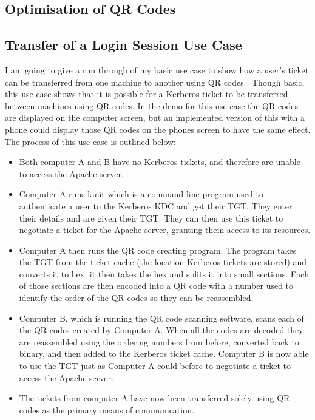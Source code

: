 \documentclass[]{report}   %
\begin{document}
\subsection{Optimisation of QR Codes}


\subsection{Transfer of a Login Session Use Case}
I am going to give a run through of my basic use case to show how a user’s ticket can be transferred from one machine to another using QR codes \cite{YouTubeDemo}. Though basic, this use case shows that it is possible for a Kerberos ticket to be transferred between machines using QR codes. In the demo for this use case the QR codes are displayed on the computer screen, but an implemented version of this with a phone could display those QR codes on the phones screen to have the same effect. The process of this use case is outlined below:

\begin{itemize}
	\item Both computer A and B have no Kerberos tickets, and therefore are unable to access the Apache server.
	\item Computer A runs kinit which is a command line program used to authenticate a user to the Kerberos KDC and get their TGT. They enter their details and are given their TGT. They can then use this ticket to negotiate a ticket for the Apache server, granting them access to its resources.
	\item Computer A then runs the QR code creating program. The program takes the TGT from the ticket cache (the location Kerberos tickets are stored) and converts it to hex, it then takes the hex and splits it into small sections. Each of those sections are then encoded into a QR code with a number used to identify the order of the QR codes so they can be reassembled. 
	\item Computer B, which is running the QR code scanning software, scans each of the QR codes created by Computer A. When all the codes are decoded they are reassembled using the ordering numbers from before, converted back to binary, and then added to the Kerberos ticket cache. Computer B is now able to use the TGT just as Computer A could before to negotiate a ticket to access the Apache server.
	\item The tickets from computer A have now been transferred solely using QR codes as the primary means of communication.
\end{itemize}
\end{document}

